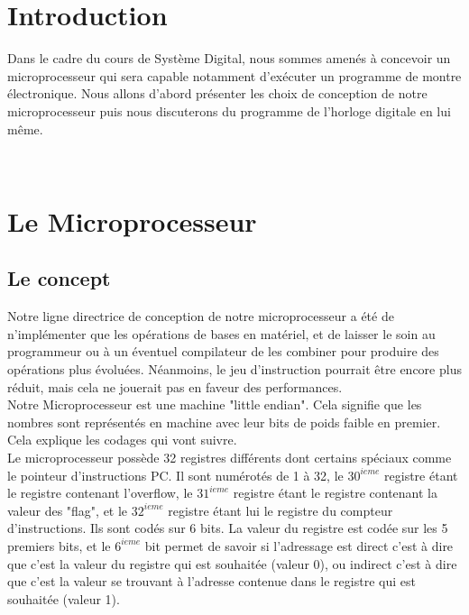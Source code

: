 \documentclass[a4paper, 12pt, twoside]{report}
\begin{document}
\section*{Introduction}

Dans le cadre du cours de Système Digital, nous sommes amenés à concevoir un microprocesseur
qui sera capable notamment d'exécuter un programme de montre électronique.
Nous allons d'abord présenter les choix de conception de notre microprocesseur
puis nous discuterons du programme de l'horloge digitale en lui même.

\newpage~
\newpage~

\section{Le Microprocesseur}

\subsection{Le concept}

Notre ligne directrice de conception de notre microprocesseur a été de n'implémenter que 
les opérations de bases en matériel, et de laisser le soin au programmeur ou à un 
éventuel compilateur de les combiner pour produire des opérations plus évoluées.
Néanmoins, le jeu d'instruction pourrait être encore plus réduit, mais cela ne jouerait 
pas en faveur des performances.\\

Notre Microprocesseur est une machine "little endian". Cela signifie que les nombres 
sont représentés en machine avec leur bits de poids faible en premier. Cela explique 
les codages qui vont suivre.\\

Le microprocesseur possède 32 registres différents dont certains spéciaux comme le 
pointeur d'instructions PC. Il sont numérotés de 1 à 32, le  $30^{ieme}$ registre étant 
le registre contenant l'overflow, le $31^{ieme}$ registre étant le 
registre contenant la valeur des "flag", et le $32^{ieme}$ registre étant lui le 
registre du compteur d'instructions. Ils sont codés sur 6 bits. La valeur du registre est codée 
sur les 5 premiers bits, et le $6^{ieme}$ bit permet de savoir si l'adressage est direct 
c'est à dire que c'est la valeur du registre qui est souhaitée (valeur 0), ou indirect 
c'est à dire que c'est la valeur se trouvant à l'adresse contenue dans le registre qui 
est souhaitée (valeur 1).\\
\end{document}
